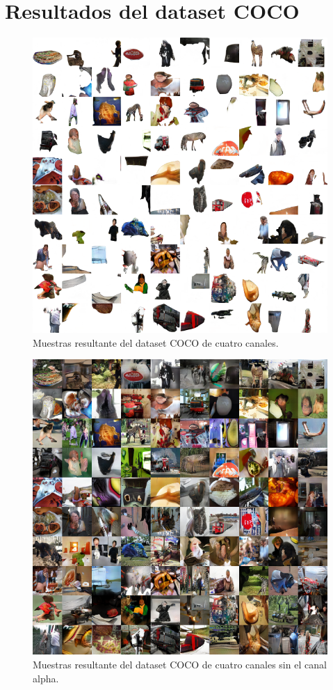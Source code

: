 \documentclass[spanish]{report}
\begin{document}
\appendix
\chapter{Resultados del dataset COCO}\label{apendice:coco}
\begin{figure}[H]
\centering
 \includegraphics[width=\linewidth]{resultados/coco_4chan_normal.png}
   \caption{Muestras resultante del dataset COCO de cuatro canales.}
  \label{fig:resultado_coco1}
\end{figure}

\begin{figure}[h]
\centering
 \includegraphics[width=\linewidth]{resultados/coco_4chan_noalpha.png}
   \caption{Muestras resultante del dataset COCO de cuatro canales sin el canal alpha.}
  \label{fig:resultado_coco2}
\end{figure}
\end{document}
